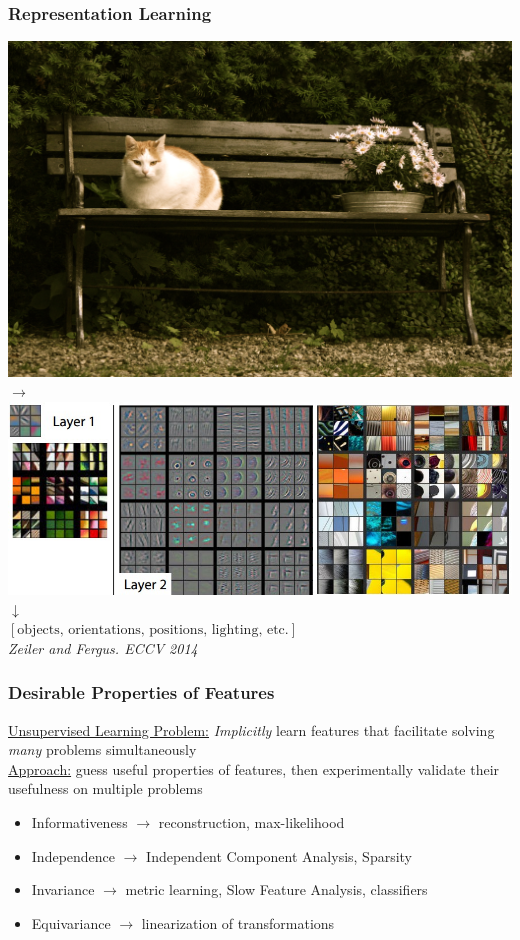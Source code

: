 \documentclass{beamer}
\begin{document}
\begin{frame} 
\frametitle{Representation Learning}
\includegraphics[scale=0.03]{./Figures/cat.jpg} $\rightarrow$ 
\includegraphics[scale=0.25]{./Figures/mattfeatures.jpeg}\\
\centering
$\downarrow$\\
\centering
$[\mbox{objects, orientations, positions, lighting, etc.}]$\\ \vspace{2cm} 
\emph{\tiny{Zeiler and Fergus. ECCV 2014}}
\end{frame} 

\begin{frame} 
\frametitle{Desirable Properties of Features}
\underline{Unsupervised Learning Problem:} \emph{Implicitly} learn features that facilitate solving \emph{many} problems simultaneously \\ \vspace{0.125cm}
\underline{Approach:} guess useful properties of features, then experimentally validate their usefulness on multiple problems
\begin{itemize}
\item{Informativeness $\rightarrow$ reconstruction, max-likelihood}
\item{Independence $\rightarrow$ Independent Component Analysis, Sparsity}
\item{Invariance $\rightarrow$ metric learning, Slow Feature Analysis, classifiers}
\item{Equivariance $\rightarrow$ linearization of transformations} 
\end{itemize} 
\end{frame} 
\end{document}
